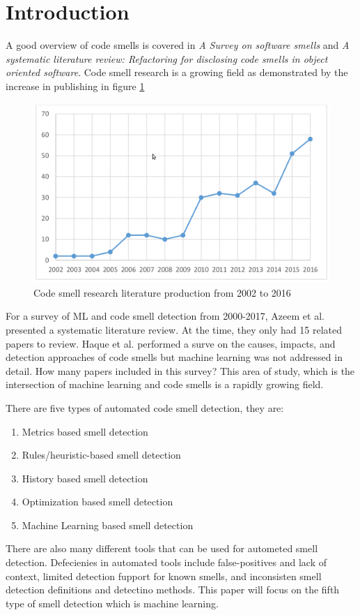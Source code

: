 \documentclass[conference]{IEEEtran}
\begin{document}
\section{Introduction}
A good overview of code smells is covered in \textit{A Survey on software smells} \cite{sharma_survey_2018} and \textit{A systematic literature review: Refactoring for disclosing code smells in object oriented software}\cite{singh_systematic_2018}. 
Code smell research is a growing field\cite{kokol_code_2018} as demonstrated by the increase in publishing in figure \ref{fig:smellresearch}
\begin{figure}[!ht]
  \centerline{\includegraphics[width=\textwidth]{Dynamicsofcodesmellresearch.png}}
  \caption{Code smell research literature production from 2002 to 2016\cite{kokol_code_2018}}
  \label{fig:smellresearch}
\end{figure} 
For a survey of ML and code smell detection from 2000-2017, Azeem et al. presented a systematic literature review\cite{azeem_machine_2019}. At the time, they only had 15 related papers to review. Haque et al.\cite{haque_causes_2018} performed a surve on the causes, impacts, and detection approaches of code smells but machine learning was not addressed in detail.
How many papers included in this survey?
This area of study, which is the intersection of machine learning and code smells is a rapidly growing field. 

There are five types of automated code smell detection\cite{lafi_code_2019}, they are:
\begin{enumerate}
\item Metrics based smell detection
\item Rules/heuristic-based smell detection
\item History based smell detection
\item Optimization based smell detection
\item Machine Learning based smell detection
\end{enumerate}
There are also many different tools\cite{walter_code_2018} that can be used for autometed smell detection.
Defecienies in automated tools include false-positives and lack of context, limited detection fupport for known smells, and inconsisten smell detection definitions and detectino methods\cite{sharma_detecting_2018}.
This paper will focus on the fifth type of smell detection which is machine learning.
\end{document}
